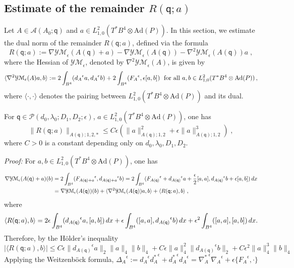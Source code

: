\documentclass[11pt]{article}
\numberwithin{equation}{section} \setlength{\topmargin}{-35pt}
\newcommand{\PP}{\mathcal{P}}
\newcommand{\Ad}{\text{Ad}}
\newcommand{\YMe}{\mathcal{YM}_{\epsilon}}
\newcommand{\q}{\mathsf{q}}
\begin{document}
\subsection{Estimate of the remainder $R(\q;a)$}
Let $A\in\mathcal{A}(A_0;\q)$ and $a\in
L^2_{1,0}(T^{\ast}B^4\otimes\Ad(P))$. In this section, we estimate
the dual norm of the remainder $R(\q;a)$, defined via the formula
$$R(\q;a):=\nabla\YMe(A(\q)+a)-\nabla\YMe(A(\q))-\nabla^2\YMe(A(\q))a\;,$$
where the Hessian of $\YMe$, denoted by $\nabla^2\YMe(A)$, is given
by
\begin{equation}
\label{3.58}
\langle\nabla^2\YMe(A)a,b\rangle:=2\int_{B^4}({d_A}^{\epsilon}a,{d_A}^{\epsilon}b)
+2\int_{B^4}({F_A}^{\epsilon},\epsilon[a,b])\;\hbox{ for all } a,
b\in L^2_{1,0}(T^{\ast}B^4\otimes\Ad(P))\,,
\end{equation}
 where
$\langle\cdot,\cdot\rangle$ denotes the pairing between
$L^2_{1,0}(T^{\ast}B^4\otimes\Ad(P))$ and its dual.
\begin{lemma}
\label{L3.2} For $\q\in\PP(d_0,\lambda_0;D_1,D_2;\epsilon)$, $a\in
L^2_{1,0}(T^{\ast}B^4\otimes\Ad(P))$, one has
$$\|R(\q;a)\|_{A(\q);1,2,\ast}\le C\epsilon(\|a\|_{A(\q);1,2}^2+\epsilon\|a\|_{A(\q);1,2}^3)\;,$$
where $C>0$ is a constant depending only on $d_0,\lambda_0,D_1,D_2$.
\end{lemma}
\textit{Proof:} For $a,b\in L^2_{1,0}(T^{\ast}B^4\otimes\Ad(P))$,
one has
\begin{align}
\notag
 \nabla\YMe(A(\q)+a)(b)&=2\int_{B^4}({F_{A(\q)+a}}^{\epsilon},{d_{A(\q)+a}}^{\epsilon}b)
=2\int_{B^4}({F_{A(\q)}}^{\epsilon}+{d_{A(\q)}}^{\epsilon}a+\frac{\epsilon}{2}[a,a],
{d_{A(\q)}}^{\epsilon}b+\epsilon[a,b])\,dx\notag\\
 &=\nabla\YMe(A(\q))(b)+\langle\nabla^2\YMe(A(\q))a,b\rangle+\langle
R(\q;a),b\rangle\;,
\end{align}
where
\begin{equation}
\notag \langle
R(\q;a),b\rangle=2\epsilon\int_{B^4}({d_{A(\q)}}^{\epsilon}a,[a,b])\,dx
+\epsilon\int_{B^4}([a,a],{d_{A(\q)}}^{\epsilon}b)\,dx+\epsilon^2\int_{B^4}([a,a],[a,b])\,dx.
\end{equation}
Therefore, by the H\"older's inequality
\begin{equation}
\label{remainder} |\langle R(\q;a),b\rangle|\le
C\epsilon\|{d_{A(\q)}}^{\epsilon}a\|_2\|a\|_4\|b\|_4
+C\epsilon\|a\|^2_4\|{d_{A(\q)}}^{\epsilon}b\|_2+C\epsilon^2\|a\|_4^3\|b\|_4
\end{equation}
Applying the Weitzenb\"ock formula,
${\Delta_A}^{\epsilon}:={d_A}^{\epsilon}{d_A^{\ast}}^{\epsilon}+{d_A^{\ast}}^{\epsilon}{d_A}^{\epsilon}={\nabla_A^{\ast}}^{\epsilon}{\nabla_A}^{\epsilon}+\epsilon\{{F_A}^{\epsilon},\cdot\}$
\end{document}
